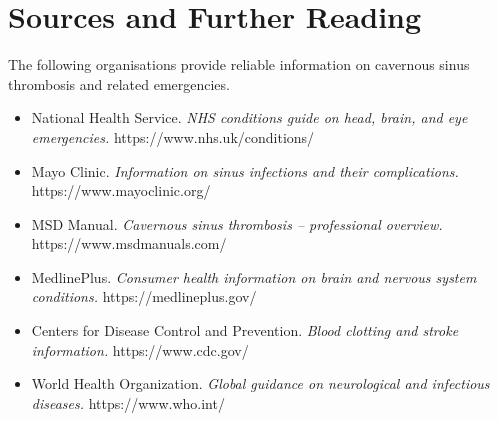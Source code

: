 \section*{Sources and Further Reading}
The following organisations provide reliable information on cavernous sinus thrombosis and related emergencies.

\begin{itemize}
    \item National Health Service. \textit{NHS conditions guide on head, brain, and eye emergencies.} https://www.nhs.uk/conditions/
    \item Mayo Clinic. \textit{Information on sinus infections and their complications.} https://www.mayoclinic.org/
    \item MSD Manual. \textit{Cavernous sinus thrombosis -- professional overview.} https://www.msdmanuals.com/
    \item MedlinePlus. \textit{Consumer health information on brain and nervous system conditions.} https://medlineplus.gov/
    \item Centers for Disease Control and Prevention. \textit{Blood clotting and stroke information.} https://www.cdc.gov/
    \item World Health Organization. \textit{Global guidance on neurological and infectious diseases.} https://www.who.int/
\end{itemize}
